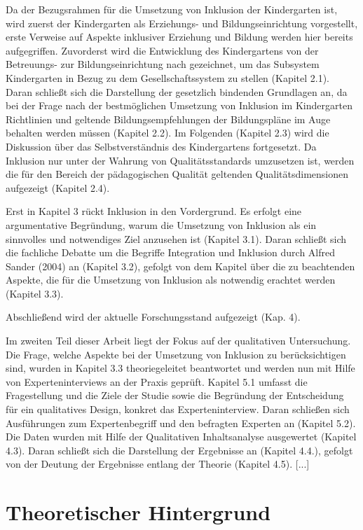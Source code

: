Da der Bezugsrahmen für die Umsetzung von Inklusion der Kindergarten ist, wird zuerst der Kindergarten als Erziehungs- und Bildungseinrichtung vorgestellt, erste Verweise auf Aspekte inklusiver Erziehung und Bildung werden hier bereits aufgegriffen.  
Zuvorderst wird die Entwicklung des Kindergartens von der Betreuungs- zur Bildungseinrichtung nach gezeichnet, um das Subsystem Kindergarten in Bezug zu dem Gesellschaftssystem zu stellen (Kapitel 2.1). Daran schließt sich die Darstellung der gesetzlich bindenden Grundlagen an, da bei der Frage nach der bestmöglichen Umsetzung von Inklusion im Kindergarten Richtlinien und geltende Bildungsempfehlungen der Bildungspläne im Auge behalten werden müssen (Kapitel 2.2).    
Im Folgenden (Kapitel 2.3) wird die Diskussion über das Selbstverständnis des Kindergartens fortgesetzt.
Da Inklusion nur unter der Wahrung von Qualitätsstandards umzusetzen ist, werden die für den Bereich der pädagogischen Qualität geltenden Qualitätsdimensionen aufgezeigt (Kapitel 2.4).

Erst in Kapitel 3 rückt Inklusion in den Vordergrund. Es erfolgt eine argumentative Begründung, warum die Umsetzung von Inklusion als ein sinnvolles und notwendiges Ziel anzusehen ist (Kapitel 3.1). Daran schließt sich die fachliche Debatte um die Begriffe Integration und Inklusion durch Alfred Sander (2004) an (Kapitel 3.2), gefolgt von dem Kapitel über die zu beachtenden Aspekte, die für die Umsetzung von Inklusion als notwendig erachtet werden (Kapitel 3.3).
 
Abschließend wird der aktuelle Forschungsstand aufgezeigt (Kap. 4).
   
Im zweiten Teil dieser Arbeit liegt der Fokus auf der qualitativen Untersuchung. Die Frage, welche Aspekte bei der Umsetzung von Inklusion zu berücksichtigen sind, wurden in Kapitel 3.3 theoriegeleitet beantwortet und werden nun mit Hilfe von Experteninterviews an der Praxis geprüft.
Kapitel 5.1 umfasst die Fragestellung und die Ziele der Studie sowie die Begründung der Entscheidung für ein qualitatives Design, konkret das Experteninterview. Daran schließen sich Ausführungen zum  Expertenbegriff und den befragten Experten an (Kapitel 5.2). Die Daten wurden mit Hilfe der Qualitativen Inhaltsanalyse ausgewertet (Kapitel 4.3). Daran schließt sich die Darstellung der Ergebnisse an (Kapitel 4.4.), gefolgt von der Deutung der Ergebnisse entlang der Theorie (Kapitel 4.5). [...] 

\part{Theoretischer Hintergrund}
